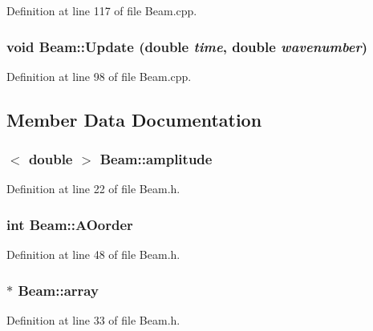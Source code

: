 Definition at line 117 of file Beam.cpp.

\hypertarget{classBeam_a4d94ec1dd570ba7b50614ae39bda51fc}{
\subsubsection[{Update}]{\setlength{\rightskip}{0pt plus 5cm}void Beam::Update (double {\em time}, \/  double {\em wavenumber})}}
\label{classBeam_a4d94ec1dd570ba7b50614ae39bda51fc}


Definition at line 98 of file Beam.cpp.



\subsection{Member Data Documentation}
\hypertarget{classBeam_ac83b6ebc1b9d745461ba630555636109}{
\subsubsection[{amplitude}]{$<$ double $>$ {\bf Beam::amplitude}}}
\label{classBeam_ac83b6ebc1b9d745461ba630555636109}


Definition at line 22 of file Beam.h.

\hypertarget{classBeam_a2de78a8bf91493e5c0cf0544613d0289}{
\subsubsection[{AOorder}]{\setlength{\rightskip}{0pt plus 5cm}int {\bf Beam::AOorder}}}
\label{classBeam_a2de78a8bf91493e5c0cf0544613d0289}


Definition at line 48 of file Beam.h.

\hypertarget{classBeam_abb5a7f1e41ea63a0e693f6e29e11e16c}{
\subsubsection[{array}]{$\ast$ {\bf Beam::array}}}
\label{classBeam_abb5a7f1e41ea63a0e693f6e29e11e16c}


Definition at line 33 of file Beam.h.

